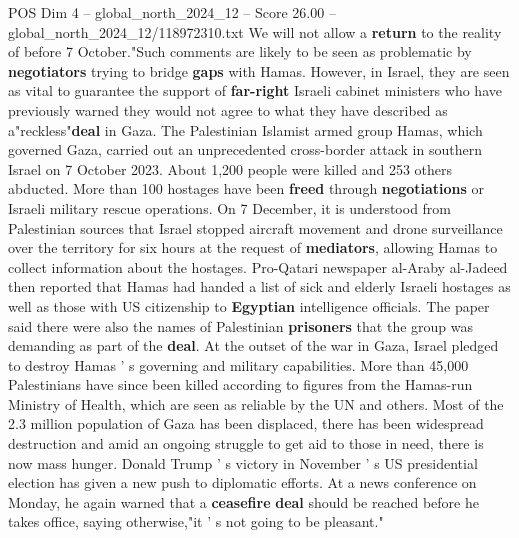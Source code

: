 \begin{textsample}{POS Dim 4 – global\_north\_2024\_12 – Score 26.00 – global\_north\_2024\_12/118972310.txt}
We will not allow a \textbf{return} to the reality of before 7 October."Such comments are likely to be seen as problematic by \textbf{negotiators} trying to bridge \textbf{gaps} with Hamas.
However, in Israel, they are seen as vital to guarantee the support of \textbf{far-right} Israeli cabinet ministers who have previously warned they would not agree to what they have described as a"reckless"\textbf{deal} in Gaza.
The Palestinian Islamist armed group Hamas, which governed Gaza, carried out an unprecedented cross-border attack in southern Israel on 7 October 2023.
About 1,200 people were killed and 253 others abducted.
More than 100 hostages have been \textbf{freed} through \textbf{negotiations} or Israeli military rescue operations.
On 7 December, it is understood from Palestinian sources that Israel stopped aircraft movement and drone surveillance over the territory for six hours at the request of \textbf{mediators}, allowing Hamas to collect information about the hostages.
Pro-Qatari newspaper al-Araby al-Jadeed then reported that Hamas had handed a list of sick and elderly Israeli hostages as well as those with US citizenship to \textbf{Egyptian} intelligence officials.
The paper said there were also the names of Palestinian \textbf{prisoners} that the group was demanding as part of the \textbf{deal}.
At the outset of the war in Gaza, Israel pledged to destroy Hamas ' s governing and military capabilities.
More than 45,000 Palestinians have since been killed according to figures from the Hamas-run Ministry of Health, which are seen as reliable by the UN and others.
Most of the 2.3 million population of Gaza has been displaced, there has been widespread destruction and amid an ongoing struggle to get aid to those in need, there is now mass hunger.
Donald Trump ' s victory in November ' s US presidential election has given a new push to diplomatic efforts.
At a news conference on Monday, he again warned that a \textbf{ceasefire} \textbf{deal} should be reached before he takes office, saying otherwise,"it ' s not going to be pleasant."

\end{textsample}
